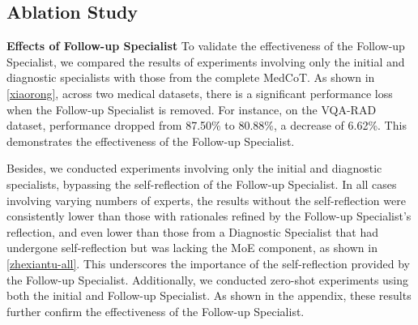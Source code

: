 \documentclass[11pt]{article}
\begin{document}
\subsection{Ablation Study}
\label{ablation}
\noindent\textbf{Effects of Follow-up Specialist}
To validate the effectiveness of the Follow-up Specialist, we compared the results of experiments involving only the initial and diagnostic specialists with those from the complete MedCoT. As shown in \autoref{xiaorong}, across two medical datasets, there is a significant performance loss when the Follow-up Specialist is removed. For instance, on the VQA-RAD dataset, performance dropped from 87.50\% to 80.88\%, a decrease of 6.62\%. This demonstrates the effectiveness of the Follow-up Specialist. 

Besides, we conducted experiments involving only the initial and diagnostic specialists, 
bypassing the self-reflection of the Follow-up Specialist. 
In all cases involving varying numbers of experts, the results without the self-reflection were consistently lower than those with rationales refined by the Follow-up Specialist’s reflection,  and even lower than those from a Diagnostic Specialist that had undergone self-reflection but was lacking the MoE component, as shown in \autoref{zhexiantu-all}. 
This underscores the importance of the self-reflection provided by the Follow-up Specialist.
Additionally, we conducted zero-shot experiments using both the initial and Follow-up Specialist. As shown in the appendix, these results further confirm the effectiveness of the Follow-up Specialist.
\end{document}
